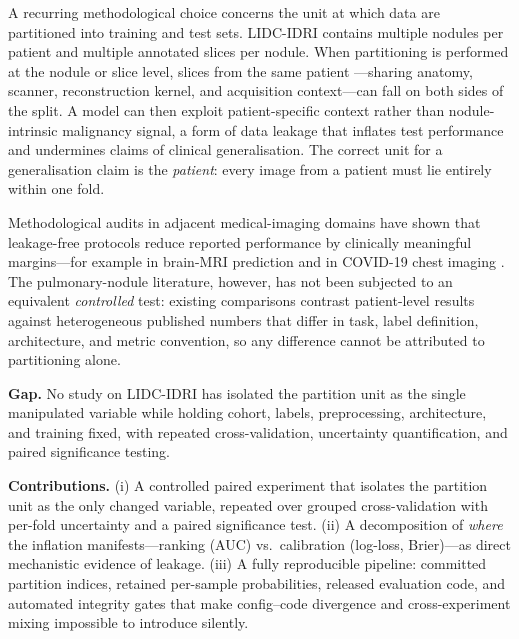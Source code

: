 \documentclass{article}
\newcommand{\vcite}[1]{\cite{#1}}
\begin{document}
A recurring methodological choice concerns the unit at which data are partitioned into training
and test sets. LIDC-IDRI contains multiple nodules per patient and multiple annotated slices per
nodule. When partitioning is performed at the nodule or slice level, slices from the same patient
---sharing anatomy, scanner, reconstruction kernel, and acquisition context---can fall on both
sides of the split. A model can then exploit patient-specific context rather than
nodule-intrinsic malignancy signal, a form of data leakage that inflates test performance and
undermines claims of clinical generalisation. The correct unit for a generalisation claim is the
\emph{patient}: every image from a patient must lie entirely within one fold.

Methodological audits in adjacent medical-imaging domains have shown that leakage-free protocols
reduce reported performance by clinically meaningful margins---for example in brain-MRI
prediction \vcite{wen2020} and in COVID-19 chest imaging \vcite{roberts2021}. The pulmonary-nodule
literature, however, has not been subjected to an equivalent \emph{controlled} test: existing
comparisons contrast patient-level results against heterogeneous published numbers that differ in
task, label definition, architecture, and metric convention, so any difference cannot be
attributed to partitioning alone.

\textbf{Gap.} No study on LIDC-IDRI has isolated the partition unit as the single manipulated
variable while holding cohort, labels, preprocessing, architecture, and training fixed, with
repeated cross-validation, uncertainty quantification, and paired significance testing.

\textbf{Contributions.} (i) A controlled paired experiment that isolates the partition unit as the
only changed variable, repeated over grouped cross-validation with per-fold uncertainty and a
paired significance test. (ii) A decomposition of \emph{where} the inflation manifests---ranking
(AUC) vs.\ calibration (log-loss, Brier)---as direct mechanistic evidence of leakage. (iii) A
fully reproducible pipeline: committed partition indices, retained per-sample probabilities,
released evaluation code, and automated integrity gates that make config--code divergence and
cross-experiment mixing impossible to introduce silently.

\end{document}
